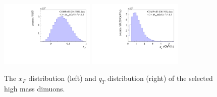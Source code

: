 \documentclass[a4paper,manyauthors,nocleardouble,COMPASS]{cernphprep}
\newcommand{\phiCS}{\varphi _{CS}}
\newcommand{\phiS}{\varphi _S}
\newcommand{\thCS}{\theta _{CS}}
\newcommand{\gvc}{GeV/$c$}
\newcommand{\gvcw}{GeV/$c^2$}
\newcommand{\mvcw}{MeV/$c^2$}
\newcommand{\mvc}{MeV/$c$}
\newcommand{\red}{\textcolor[rgb]{1.00,0.00,0.00}}
\begin{document}
%
\begin{figure}[tbp]
\centering
\includegraphics[width=0.40\textwidth]{plots/DY2015_Mr4_NH3_xF.pdf}
\hskip 1cm
\includegraphics[width=0.40\textwidth]{plots/DY2015_Mr4_NH3_qT.pdf}
\caption{The $x_{F}$ distribution (left) and $q_T$ distribution (right)
of the selected high mass dimuons.}
\label{fig:xF_qT}
\end{figure}

%


\end{document}
